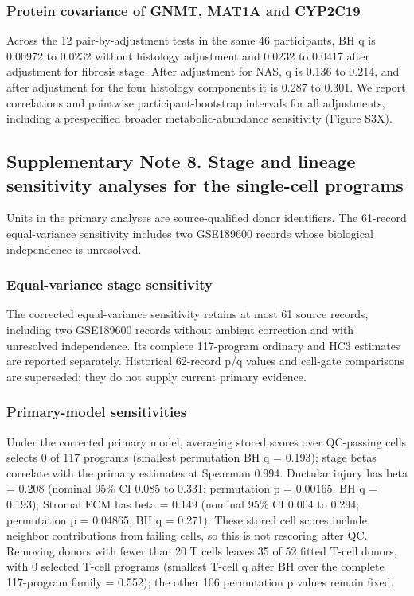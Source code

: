 \subsubsection{Protein covariance of GNMT, MAT1A and CYP2C19}\label{protein-covariance-of-gnmt-mat1a-and-cyp2c19}

Across the 12 pair-by-adjustment tests in the same 46 participants, BH q is 0.00972 to 0.0232 without histology adjustment and 0.0232 to 0.0417 after adjustment for fibrosis stage. After adjustment for NAS, q is 0.136 to 0.214, and after adjustment for the four histology components it is 0.287 to 0.301. We report correlations and pointwise participant-bootstrap intervals for all adjustments, including a prespecified broader metabolic-abundance sensitivity (Figure S3X).

\subsection{Supplementary Note 8. Stage and lineage sensitivity analyses for the single-cell programs}\label{supplementary-note-8.-stage-and-lineage-sensitivity-analyses-for-the-single-cell-programs}

Units in the primary analyses are source-qualified donor identifiers. The 61-record equal-variance sensitivity includes two GSE189600 records whose biological independence is unresolved.

\subsubsection{Equal-variance stage sensitivity}\label{equal-variance-stage-sensitivity}

The corrected equal-variance sensitivity retains at most 61 source records, including two GSE189600 records without ambient correction and with unresolved independence. Its complete 117-program ordinary and HC3 estimates are reported separately. Historical 62-record p/q values and cell-gate comparisons are superseded; they do not supply current primary evidence.

\subsubsection{Primary-model sensitivities}\label{primary-model-sensitivities}

Under the corrected primary model, averaging stored scores over QC-passing cells selects 0 of 117 programs (smallest permutation BH q = 0.193); stage betas correlate with the primary estimates at Spearman 0.994. Ductular injury has beta = 0.208 (nominal 95\% CI 0.085 to 0.331; permutation p = 0.00165, BH q = 0.193); Stromal ECM has beta = 0.149 (nominal 95\% CI 0.004 to 0.294; permutation p = 0.04865, BH q = 0.271). These stored cell scores include neighbor contributions from failing cells, so this is not rescoring after QC. Removing donors with fewer than 20 T cells leaves 35 of 52 fitted T-cell donors, with 0 selected T-cell programs (smallest T-cell q after BH over the complete 117-program family = 0.552); the other 106 permutation p values remain fixed.

